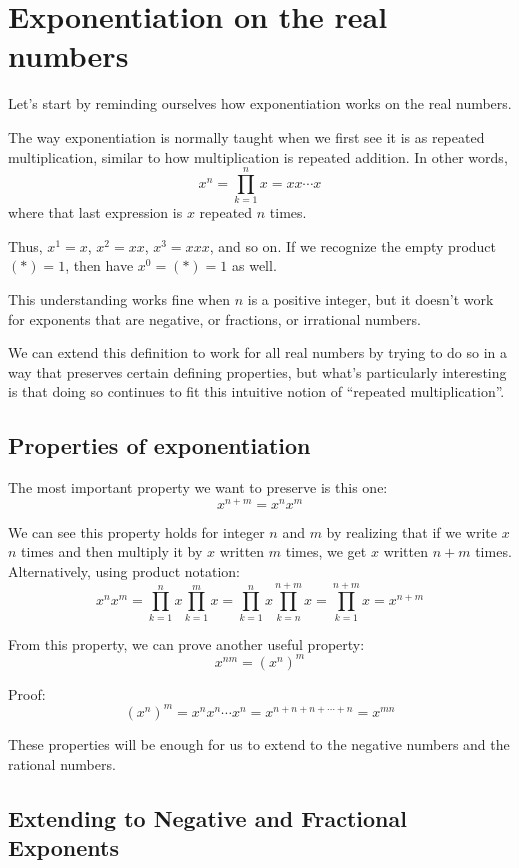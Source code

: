 \documentclass[11pt, oneside]{article}   	%
\begin{document}
\section{Exponentiation on the real numbers}

Let's start by reminding ourselves how exponentiation works on the real numbers.

The way exponentiation is normally taught when we first see it is as repeated multiplication, similar to how multiplication is repeated addition. In other words,
\[x^n = \prod_{k=1}^{n}x = xx\cdots x\]
where that last expression is $x$ repeated $n$ times.

Thus, \(x^1 = x\), \(x^2=xx\), \(x^3=xxx\), and so on. If we recognize the empty product \((*)=1\), then have \(x^0 = (*) = 1\) as well.

This understanding works fine when $n$ is a positive integer, but it doesn't work for exponents that are negative, or fractions, or irrational numbers.

We can extend this definition to work for all real numbers by trying to do so in a way that preserves certain defining properties, but what's particularly interesting is that doing so continues to fit this intuitive notion of ``repeated multiplication''.

\subsection{Properties of exponentiation}

The most important property we want to preserve is this one: \[x^{n+m} = x^nx^m\]

We can see this property holds for integer $n$ and $m$ by realizing that if we write $x$ $n$ times and then multiply it by $x$ written $m$ times, we get $x$ written $n+m$ times. Alternatively, using product notation: \[x^nx^m = \prod_{k=1}^{n}x \prod_{k=1}^{m}x = \prod_{k=1}^{n}x \prod_{k=n}^{n+m}x = \prod_{k=1}^{n+m}x = x^{n+m}\]

From this property, we can prove another useful property: \[x^{nm} = (x^n)^m\]

Proof:
\[(x^n)^m = x^nx^n\cdots x^n = x^{n+n+n+\cdots+n} = x^{mn}\]

These properties will be enough for us to extend to the negative numbers and the rational numbers.

\subsection{Extending to Negative and Fractional Exponents}
\end{document}
